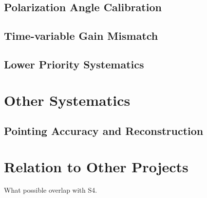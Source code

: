 \documentclass[12pt]{article}
\begin{document}
\subsection{Polarization Angle Calibration}

\subsection{Time-variable Gain Mismatch}

\subsection{Lower Priority Systematics}

\section{Other Systematics}

\subsection{Pointing Accuracy and Reconstruction}

\section{Relation to Other Projects}

What possible overlap with S4.


\end{document}

